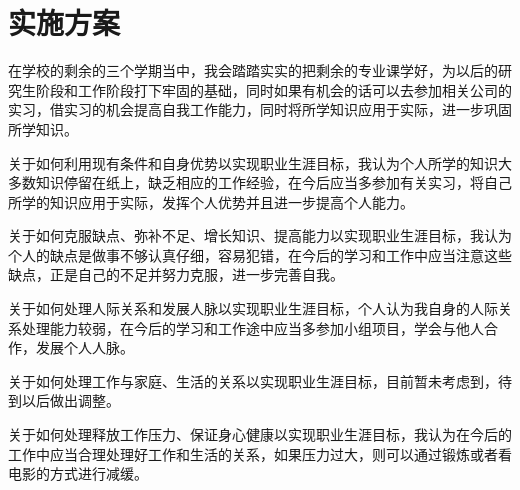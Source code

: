 \documentclass{article}
\begin{document}
\section{实施方案}
在学校的剩余的三个学期当中，我会踏踏实实的把剩余的专业课学好，为以后的研究生阶段和工作阶段打下牢固的基础，同时如果有机会的话可以去参加相关公司的实习，借实习的机会提高自我工作能力，同时将所学知识应用于实际，进一步巩固所学知识。
\par
关于如何利用现有条件和自身优势以实现职业生涯目标，我认为个人所学的知识大多数知识停留在纸上，缺乏相应的工作经验，在今后应当多参加有关实习，将自己所学的知识应用于实际，发挥个人优势并且进一步提高个人能力。
\par
关于如何克服缺点、弥补不足、增长知识、提高能力以实现职业生涯目标，我认为个人的缺点是做事不够认真仔细，容易犯错，在今后的学习和工作中应当注意这些缺点，正是自己的不足并努力克服，进一步完善自我。
\par
关于如何处理人际关系和发展人脉以实现职业生涯目标，个人认为我自身的人际关系处理能力较弱，在今后的学习和工作途中应当多参加小组项目，学会与他人合作，发展个人人脉。
\par
关于如何处理工作与家庭、生活的关系以实现职业生涯目标，目前暂未考虑到，待到以后做出调整。
\par
关于如何处理释放工作压力、保证身心健康以实现职业生涯目标，我认为在今后的工作中应当合理处理好工作和生活的关系，如果压力过大，则可以通过锻炼或者看电影的方式进行减缓。
\par 

\end{document}
